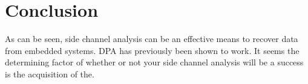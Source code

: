 \section{Conclusion}\label{sec::conclusion} 


	As can be seen, side channel analysis can be an effective means to recover data from embedded systems.  DPA has previously been shown to work.  It seems the determining factor of whether or not your side channel analysis will be a success is the acquisition of the.












